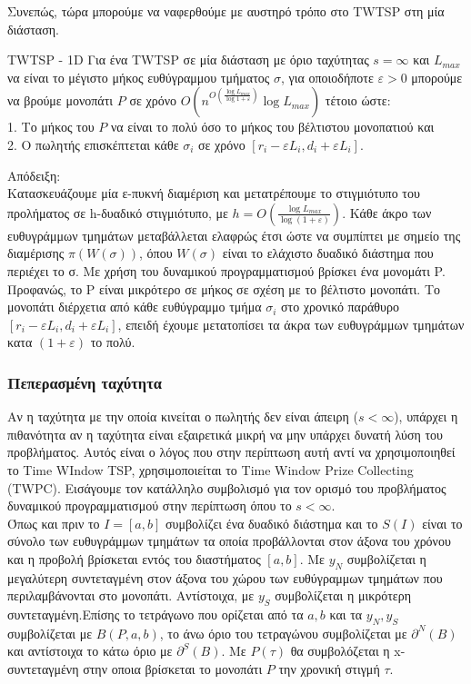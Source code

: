 \documentclass[oneside,12pt]{book}
\theoremstyle{definition}
\begin{document}
Συνεπώς, τώρα μπορούμε να ναφερθούμε με αυστηρό τρόπο στο TWTSP στη μία διάσταση. \\

\begin{mytheorem}{TWTSP - 1D}{}
	Για ένα TWTSP σε μία διάσταση με όριο ταχύτητας \(s = \infty\) και \(L_{max}\) να είναι το μέγιστο μήκος ευθύγραμμου τμήματος \(σ\), για οποιοδήποτε \(ε > 0\) μπορούμε να βρούμε μονοπάτι \(P\) σε χρόνο \(Ο(n^{O(\frac{\log L_{max}}{\log 1 + ε})} \log L_{max})\) τέτοιο ώστε: \\
	1. Το μήκος του \(P\) να είναι το πολύ όσο το μήκος του βέλτιστου μονοπατιού και \\
	2. Ο πωλητής επισκέπτεται κάθε \(σ_i\) σε χρόνο \([r_i - εL_i, d_i + εL_i]\). 
\end{mytheorem}

Απόδειξη: \\
Κατασκευάζουμε μία ε-πυκνή διαμέριση και μετατρέπουμε το στιγμιότυπο του προλήματος σε h-δυαδικό στιγμιότυπο, με \(h = O(\frac{\log L_{max}}{\log (1+ε)})\). Κάθε άκρο των ευθυγράμμων τμημάτων μεταβάλλεται ελαφρώς έτσι ώστε να συμπίπτει με σημείο της διαμέρισης \(π(W(σ))\), όπου \(W(σ)\) είναι το ελάχιστο δυαδικό διάστημα που περιέχει το σ. Με χρήση του δυναμικού προγραμματισμού βρίσκει ένα μονομάτι P. Προφανώς, το P είναι μικρότερο σε μήκος σε σχέση με το βέλτιστο μονοπάτι. Το μονοπάτι διέρχετια από κάθε ευθύγραμμο τμήμα \(σ_i\) στο χρονικό παράθυρο \([r_i - εL_i, d_i + εL_i]\), επειδή έχουμε μετατοπίσει τα άκρα των ευθυγράμμων τμημάτων κατα \((1+ε)\) το πολύ. 

\subsubsection{Πεπερασμένη ταχύτητα}

Αν η ταχύτητα με την οποία κινείται ο πωλητής δεν είναι άπειρη (\(s < \infty\)), υπάρχει η πιθανότητα αν η ταχύτητα είναι εξαιρετικά μικρή να μην υπάρχει δυνατή λύση του προβλήματος. Αυτός είναι ο λόγος που στην περίπτωση αυτή αντί να χρησιμοποιηθεί το Time WIndow TSP, χρησιμοποιείται το Time Window Prize Collecting (TWPC). Εισάγουμε τον κατάλληλο συμβολισμό για τον ορισμό του προβλήματος δυναμικού προγραμματισμού στην περίπτωση όπου το \(s < \infty\). \\

Όπως και πριν το \(I = [a,b]\) συμβολίζει ένα δυαδικό διάστημα και το \(S(I)\) είναι το σύνολο των ευθυγράμμων τμημάτων τα οποία προβάλλονται στον άξονα του χρόνου και η προβολή βρίσκεται εντός του διαστήματος \([a,b]\). Με \(y_N\) συμβολίζεται η μεγαλύτερη συντεταγμένη στον άξονα του χώρου των ευθύγραμμων τμημάτων που περιλαμβάνονται στο μονοπάτι. Αντίστοιχα, με \(y_S\) συμβολίζεται η μικρότερη συντεταγμένη.Επίσης το τετράγωνο που ορίζεται από τα \(a,b\) και τα \(y_N, y_S\) συμβολίζεται με \(B(P,a,b)\), το άνω όριο του τετραγώνου συμβολίζεται με \(\partial^{N}(B)\) και αντίστοιχα το κάτω όριο με \(\partial^{S}(B)\). Με \(P(τ)\) θα συμβολόζεται η x-συντεταγμένη στην οποια βρίσκεται το μονοπάτι \(P\) την χρονική στιγμή \(τ\).
\end{document}
